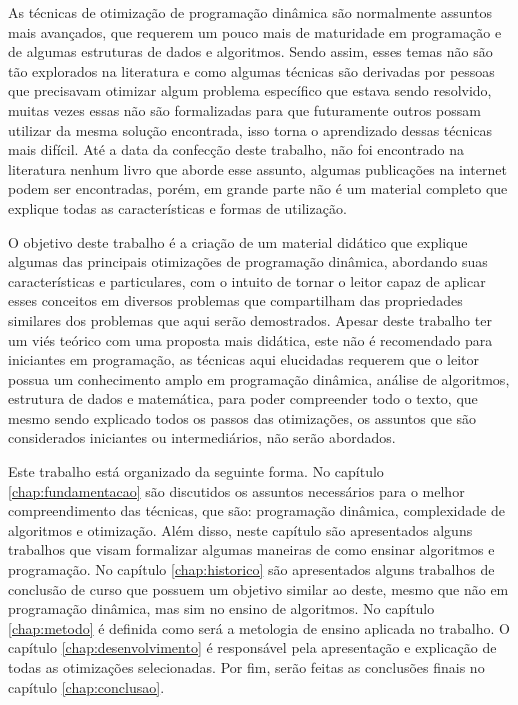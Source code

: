 As técnicas de otimização de programação dinâmica são normalmente assuntos mais avançados, que requerem um pouco mais de maturidade em programação e de algumas estruturas de dados e algoritmos. Sendo assim, esses temas não são tão explorados na literatura e como algumas técnicas são derivadas por pessoas que precisavam otimizar algum problema específico que estava sendo resolvido, muitas vezes essas não são formalizadas para que futuramente outros possam utilizar da mesma solução encontrada, isso torna o aprendizado dessas técnicas mais difícil. Até a data da confecção deste trabalho, não foi encontrado na literatura nenhum livro que aborde esse assunto, algumas publicações na internet podem ser encontradas, porém, em grande parte não é um material completo que explique todas as características e formas de utilização.

O objetivo deste trabalho é a criação de um material didático que explique algumas das principais otimizações de programação dinâmica, abordando suas características e particulares, com o intuito de tornar o leitor capaz de aplicar esses conceitos em diversos problemas que compartilham das propriedades similares dos problemas que aqui serão demostrados. Apesar deste trabalho ter um viés teórico com uma proposta mais didática, este não é recomendado para iniciantes em programação, as técnicas aqui elucidadas requerem que o leitor possua um conhecimento amplo em programação dinâmica, análise de algoritmos, estrutura de dados e matemática, para poder compreender todo o texto, que mesmo sendo explicado todos os passos das otimizações, os assuntos que são considerados iniciantes ou intermediários, não serão abordados.

Este trabalho está organizado da seguinte forma. No capítulo \ref{chap:fundamentacao} são discutidos os assuntos necessários para o melhor compreendimento das técnicas, que são: programação dinâmica, complexidade de algoritmos e otimização. Além disso, neste capítulo são apresentados alguns trabalhos que visam formalizar algumas maneiras de como ensinar algoritmos e programação. No capítulo \ref{chap:historico} são apresentados alguns trabalhos de conclusão de curso que possuem um objetivo similar ao deste, mesmo que não em programação dinâmica, mas sim no ensino de algoritmos. No capítulo \ref{chap:metodo} é definida como será a metologia de ensino aplicada no trabalho. O capítulo \ref{chap:desenvolvimento} é responsável pela apresentação e explicação de todas as otimizações selecionadas. Por fim, serão feitas as conclusões finais no capítulo \ref{chap:conclusao}.

